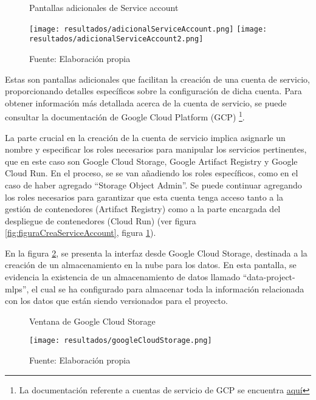 \newpage

\begin{figure}[h]
	\centering
	\caption{Pantallas adicionales de Service account}
	\texttt{[image: resultados/adicionalServiceAccount.png]}
	\texttt{[image: resultados/adicionalServiceAccount2.png]}
	\caption*{\footnotesize Fuente: Elaboración propia}
	\label{fig:figuraAdicionalServiceAccount}
\end{figure}

\newpage

Estas son pantallas adicionales que facilitan la creación de una cuenta de servicio, proporcionando detalles específicos sobre la configuración de dicha cuenta. Para obtener información más detallada acerca de la cuenta de servicio, se puede consultar la documentación de Google Cloud Platform (GCP) \footnote{La documentación referente a cuentas de servicio de GCP se encuentra \href{https://cloud.google.com/iam/docs/service-account-overview?hl=es-419}{aquí}}. \newline

La parte crucial en la creación de la cuenta de servicio implica asignarle un nombre y especificar los roles necesarios para manipular los servicios pertinentes, que en este caso son Google Cloud Storage, Google Artifact Registry y Google Cloud Run. En el proceso, se se van añadiendo los roles específicos, como en el caso de haber agregado ``Storage Object Admin''. Se puede continuar agregando los roles necesarios para garantizar que esta cuenta tenga acceso tanto a la gestión de contenedores (Artifact Registry) como a la parte encargada del despliegue de contenedores (Cloud Run) (ver figura \ref{fig:figuraCreaServiceAccount}, figura \ref{fig:figuraAdicionalServiceAccount}). \newline

En la figura \ref{fig:figuraGoogleCloudStorage}, se presenta la interfaz desde Google Cloud Storage, destinada a la creación de un almacenamiento en la nube para los datos. En esta pantalla, se evidencia la existencia de un almacenamiento de datos llamado ``data-project-mlps'', el cual se ha configurado para almacenar toda la información relacionada con los datos que están siendo versionados para el proyecto.

\newpage

\begin{figure}[h]
	\centering
	\caption{Ventana de Google Cloud Storage}
	\texttt{[image: resultados/googleCloudStorage.png]}
	\caption*{\footnotesize Fuente: Elaboración propia}
	\label{fig:figuraGoogleCloudStorage}
\end{figure}

